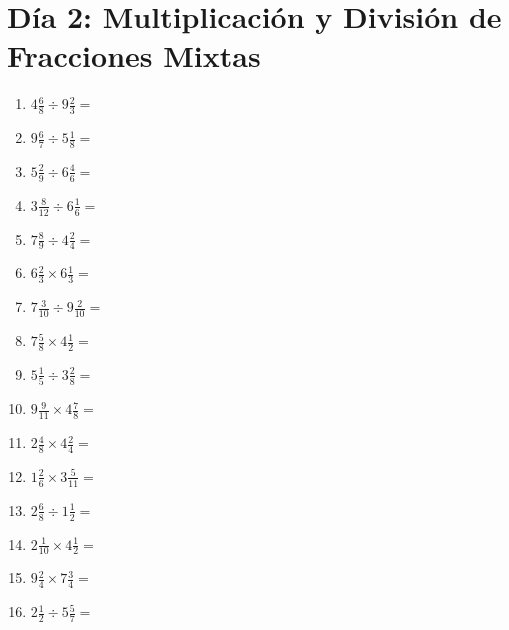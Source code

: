 \documentclass[12pt]{article}
\begin{document}
\section*{Día 2: Multiplicación y División de Fracciones Mixtas}
\begin{enumerate}
\item \large $ 4 \frac{6}{8} \div 9 \frac{2}{3} = $ \vspace{1.6cm}
\item \large $ 9 \frac{6}{7} \div 5 \frac{1}{8} = $ \vspace{1.6cm}
\item \large $ 5 \frac{2}{9} \div 6 \frac{4}{6} = $ \vspace{1.6cm}
\item \large $ 3 \frac{8}{12} \div 6 \frac{1}{6} = $ \vspace{1.6cm}
\item \large $ 7 \frac{8}{9} \div 4 \frac{2}{4} = $ \vspace{1.6cm}
\item \large $ 6 \frac{2}{3} \times 6 \frac{1}{3} = $ \vspace{1.6cm}
\item \large $ 7 \frac{3}{10} \div 9 \frac{2}{10} = $ \vspace{1.6cm}
\item \large $ 7 \frac{5}{8} \times 4 \frac{1}{2} = $ \vspace{1.6cm}
\item \large $ 5 \frac{1}{5} \div 3 \frac{2}{8} = $ \vspace{1.6cm}
\item \large $ 9 \frac{9}{11} \times 4 \frac{7}{8} = $ \vspace{1.6cm}
\newpage
\item \large $ 2 \frac{4}{8} \times 4 \frac{2}{4} = $ \vspace{1.6cm}
\item \large $ 1 \frac{2}{6} \times 3 \frac{5}{11} = $ \vspace{1.6cm}
\item \large $ 2 \frac{6}{8} \div 1 \frac{1}{2} = $ \vspace{1.6cm}
\item \large $ 2 \frac{1}{10} \times 4 \frac{1}{2} = $ \vspace{1.6cm}
\item \large $ 9 \frac{2}{4} \times 7 \frac{3}{4} = $ \vspace{1.6cm}
\item \large $ 2 \frac{1}{2} \div 5 \frac{5}{7} = $ \vspace{1.6cm}

\end{enumerate}
\end{document}
